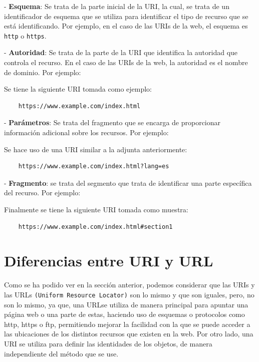 \documentclass[11pt]{report}
\begin{document}
- \textbf{Esquema}: Se trata de la parte inicial de la URI, la cual, se trata de un identificador de esquema que se utiliza para identificar el tipo de recurso que se está identificando. Por ejemplo, en el caso de las URIs de la web, el esquema es \texttt{http} o \texttt{https}.

- \textbf{Autoridad}: Se trata de la parte de la URI que identifica la autoridad que controla el recurso. En el caso de las URIs de la web, la autoridad es el nombre de dominio. Por ejemplo:

Se tiene la siguiente URI tomada como ejemplo:

\begin{verbatim}
	https://www.example.com/index.html
\end{verbatim}


- \textbf{Parámetros}: Se trata del fragmento que se encarga de proporcionar información adicional sobre los recursos. Por ejemplo:

Se hace uso de una URI similar a la adjunta anteriormente:

\begin{verbatim}
	https://www.example.com/index.html?lang=es
\end{verbatim}


- \textbf{Fragmento}: se trata del segmento que trata de identificar una parte específica del recurso. Por ejemplo:

Finalmente se tiene la siguiente URI tomada como muestra:

\begin{verbatim}
	https://www.example.com/index.html#section1
\end{verbatim}


\section{Diferencias entre URI y URL}

Como se ha podido ver en la sección anterior, podemos considerar que las URIs y las URLs \texttt{(Uniform Resource Locator)} son lo mismo y que son iguales, pero, no son lo mismo, ya que, una URLse utiliza de manera principal para apuntar una página web o una parte de estas, haciendo uso de esquemas o protocolos como http, https o ftp, permitiendo mejorar la facilidad con la que se puede acceder a las ubicaciones de los distintos recursos que existen en la web. Por otro lado, una URI se utiliza para definir las identidades de los objetos, de manera independiente del método que se use. 
\end{document}
